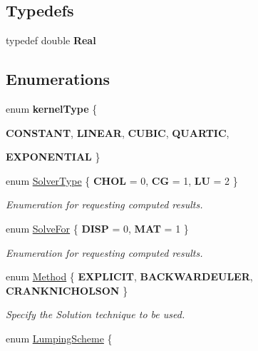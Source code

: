 \subsection*{Typedefs}
\begin{DoxyCompactItemize}
\item 
\hypertarget{namespacevoom_aedfa692843b69f9b9dca12ef77388d57}{
typedef double {\bfseries Real}}
\label{namespacevoom_aedfa692843b69f9b9dca12ef77388d57}

\end{DoxyCompactItemize}
\subsection*{Enumerations}
\begin{DoxyCompactItemize}
\item 
enum {\bfseries kernelType} \{ \par
{\bfseries CONSTANT}, 
{\bfseries LINEAR}, 
{\bfseries CUBIC}, 
{\bfseries QUARTIC}, 
\par
{\bfseries EXPONENTIAL}
 \}
\item 
enum \hyperlink{namespacevoom_a2874640a1124292b983171d745088fef}{SolverType} \{ {\bfseries CHOL} =  0, 
{\bfseries CG} =  1, 
{\bfseries LU} =  2
 \}
\begin{DoxyCompactList}\small\item\em Enumeration for requesting computed results. \item\end{DoxyCompactList}\item 
enum \hyperlink{namespacevoom_a6dc64c378b8a785d6a835fe4d27b5588}{SolveFor} \{ {\bfseries DISP} =  0, 
{\bfseries MAT} =  1
 \}
\begin{DoxyCompactList}\small\item\em Enumeration for requesting computed results. \item\end{DoxyCompactList}\item 
enum \hyperlink{namespacevoom_aa7998516d4918c6d10beb11401158a43}{Method} \{ {\bfseries EXPLICIT}, 
{\bfseries BACKWARDEULER}, 
{\bfseries CRANKNICHOLSON}
 \}
\begin{DoxyCompactList}\small\item\em Specify the Solution technique to be used. \item\end{DoxyCompactList}\item 
enum \hyperlink{namespacevoom_aad2b72d6024982ad6a82eccb9698964e}{LumpingScheme} \{ \par

\end{DoxyCompactItemize}
